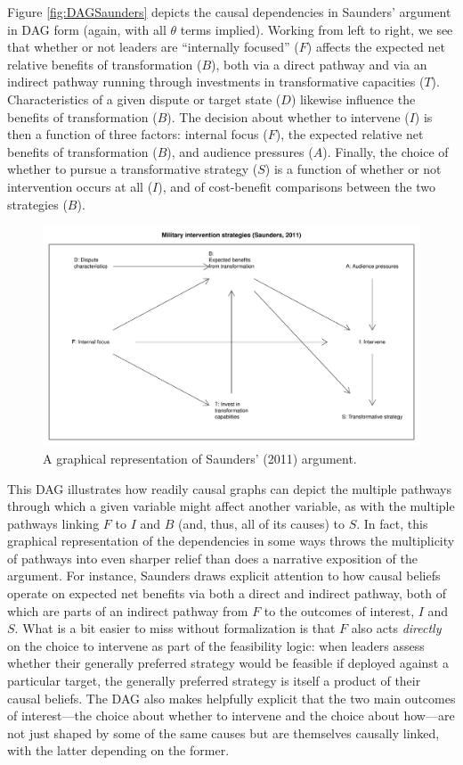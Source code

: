 \documentclass[
  12pt,
]{book}
\begin{document}
Figure \ref{fig:DAGSaunders} depicts the causal dependencies in Saunders' argument in DAG form (again, with all \(\theta\) terms implied). Working from left to right, we see that whether or not leaders are ``internally focused'' (\(F\)) affects the expected net relative benefits of transformation (\(B\)), both via a direct pathway and via an indirect pathway running through investments in transformative capacities (\(T\)). Characteristics of a given dispute or target state (\(D\)) likewise influence the benefits of transformation (\(B\)). The decision about whether to intervene (\(I\)) is then a function of three factors: internal focus (\(F\)), the expected relative net benefits of transformation (\(B\)), and audience pressures (\(A\)). Finally, the choice of whether to pursue a transformative strategy (\(S\)) is a function of whether or not intervention occurs at all (\(I\)), and of cost-benefit comparisons between the two strategies (\(B\)).

\begin{figure}

{\centering \includegraphics[width=.7\textwidth]{ii_files/figure-latex/saunders-1} 

}

\caption{\label{fig:DAGSaunders} A graphical representation of Saunders' (2011) argument.}\label{fig:saunders}
\end{figure}

This DAG illustrates how readily causal graphs can depict the multiple pathways through which a given variable might affect another variable, as with the multiple pathways linking \(F\) to \(I\) and \(B\) (and, thus, all of its causes) to \(S\). In fact, this graphical representation of the dependencies in some ways throws the multiplicity of pathways into even sharper relief than does a narrative exposition of the argument. For instance, Saunders draws explicit attention to how causal beliefs operate on expected net benefits via both a direct and indirect pathway, both of which are parts of an indirect pathway from \(F\) to the outcomes of interest, \(I\) and \(S\). What is a bit easier to miss without formalization is that \(F\) also acts \emph{directly} on the choice to intervene as part of the feasibility logic: when leaders assess whether their generally preferred strategy would be feasible if deployed against a particular target, the generally preferred strategy is itself a product of their causal beliefs. The DAG also makes helpfully explicit that the two main outcomes of interest---the choice about whether to intervene and the choice about how---are not just shaped by some of the same causes but are themselves causally linked, with the latter depending on the former.
\end{document}
